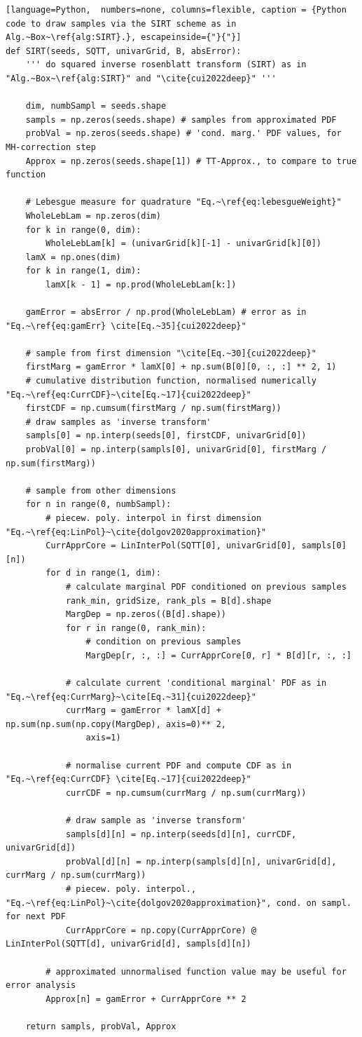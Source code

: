 \clearpage
\begin{lstlisting}[language=Python,	 numbers=none, columns=flexible, caption = {Python code to draw samples via the SIRT scheme as in Alg.~Box~\ref{alg:SIRT}.}, escapeinside={"}{"}]
def SIRT(seeds, SQTT, univarGrid, B, absError):
	''' do squared inverse rosenblatt transform (SIRT) as in "Alg.~Box~\ref{alg:SIRT}" and "\cite{cui2022deep}" '''
	
	dim, numbSampl = seeds.shape
	sampls = np.zeros(seeds.shape) # samples from approximated PDF
	probVal = np.zeros(seeds.shape) # 'cond. marg.' PDF values, for MH-correction step
	Approx = np.zeros(seeds.shape[1]) # TT-Approx., to compare to true function
	
	# Lebesgue measure for quadrature "Eq.~\ref{eq:lebesgueWeight}"
	WholeLebLam = np.zeros(dim)
	for k in range(0, dim):
		WholeLebLam[k] = (univarGrid[k][-1] - univarGrid[k][0])
	lamX = np.ones(dim)
	for k in range(1, dim):
		lamX[k - 1] = np.prod(WholeLebLam[k:])
	
	gamError = absError / np.prod(WholeLebLam) # error as in "Eq.~\ref{eq:gamErr} \cite[Eq.~35]{cui2022deep}"
	
	# sample from first dimension "\cite[Eq.~30]{cui2022deep}"
	firstMarg = gamError * lamX[0] + np.sum(B[0][0, :, :] ** 2, 1)
	# cumulative distribution function, normalised numerically "Eq.~\ref{eq:CurrCDF}~\cite[Eq.~17]{cui2022deep}"
	firstCDF = np.cumsum(firstMarg / np.sum(firstMarg))
	# draw samples as 'inverse transform'
	sampls[0] = np.interp(seeds[0], firstCDF, univarGrid[0])
	probVal[0] = np.interp(sampls[0], univarGrid[0], firstMarg / np.sum(firstMarg))
	
	# sample from other dimensions
	for n in range(0, numbSampl):
		# piecew. poly. interpol in first dimension "Eq.~\ref{eq:LinPol}~\cite{dolgov2020approximation}"
		CurrApprCore = LinInterPol(SQTT[0], univarGrid[0], sampls[0][n])
		for d in range(1, dim):
			# calculate marginal PDF conditioned on previous samples
			rank_min, gridSize, rank_pls = B[d].shape
			MargDep = np.zeros((B[d].shape))
			for r in range(0, rank_min):
				# condition on previous samples
				MargDep[r, :, :] = CurrApprCore[0, r] * B[d][r, :, :]
				
			# calculate current 'conditional marginal' PDF as in "Eq.~\ref{eq:CurrMarg}~\cite[Eq.~31]{cui2022deep}"
			currMarg = gamError * lamX[d] + np.sum(np.sum(np.copy(MargDep), axis=0)** 2,
				axis=1) 
			 
			# normalise current PDF and compute CDF as in "Eq.~\ref{eq:CurrCDF} \cite[Eq.~17]{cui2022deep}"
			currCDF = np.cumsum(currMarg / np.sum(currMarg))
			
			# draw sample as 'inverse transform'
			sampls[d][n] = np.interp(seeds[d][n], currCDF, univarGrid[d])
			probVal[d][n] = np.interp(sampls[d][n], univarGrid[d], currMarg / np.sum(currMarg))
			# piecew. poly. interpol., "Eq.~\ref{eq:LinPol}~\cite{dolgov2020approximation}", cond. on sampl. for next PDF
			CurrApprCore = np.copy(CurrApprCore) @ LinInterPol(SQTT[d], univarGrid[d], sampls[d][n]) 
	
		# approximated unnormalised function value may be useful for error analysis
		Approx[n] = gamError + CurrApprCore ** 2
	
	return sampls, probVal, Approx
\end{lstlisting}
